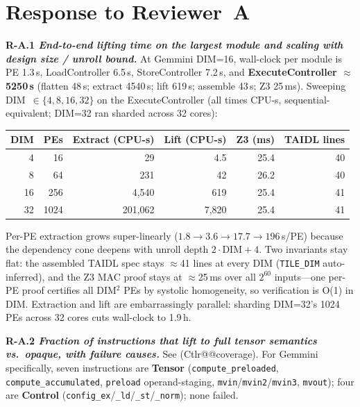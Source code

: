 \documentclass[sigconf, anonymous]{acmart}
\makeatletter
\newcommand{\cref}[1]{(C\csname tlr@@#1\endcsname)}
\makeatother
\begin{document}
\section*{Response to Reviewer~A}

\noindent\textbf{R-A.1 \emph{End-to-end lifting time on the largest module and scaling with design size / unroll bound.}}
At Gemmini DIM=16, wall-clock per module is PE 1.3\,s, LoadController
6.5\,s, StoreController 7.2\,s, and \textbf{ExecuteController
$\approx$5250\,s} (flatten 48\,s; extract 4540\,s; lift 619\,s; assemble
43\,s; Z3 25\,ms). Sweeping DIM~$\in\{4,8,16,32\}$ on the
ExecuteController (all times CPU-s, sequential-equivalent; DIM=32 ran
sharded across 32 cores):

\smallskip
\noindent\begin{minipage}{\linewidth}\centering\scriptsize
\begin{tabular}{@{}rrrrrr@{}}
\toprule
DIM & PEs & Extract (CPU-s) & Lift (CPU-s) & Z3 (ms) & TAIDL lines \\
\midrule
 4 &   16 &       29   &     4.5 & 25.4 & 40 \\
 8 &   64 &      231   &      42 & 26.2 & 40 \\
16 &  256 &   4{,}540  &     619 & 25.4 & 41 \\
32 & 1024 & 201{,}062  & 7{,}820 & 25.4 & 41 \\
\bottomrule
\end{tabular}
\end{minipage}
\smallskip

\noindent
Per-PE extraction grows super-linearly
($1.8\!\to\!3.6\!\to\!17.7\!\to\!196$\,s/PE) because the dependency cone
deepens with unroll depth $2\!\cdot\!\text{DIM}+4$. Two invariants stay
flat: the assembled TAIDL spec stays $\approx$41 lines at every DIM
(\texttt{TILE\_DIM} auto-inferred), and the Z3 MAC proof stays at
$\approx$25\,ms over all $2^{60}$ inputs---one per-PE proof certifies
all DIM$^2$ PEs by systolic homogeneity, so verification is O(1) in
DIM. Extraction and lift are embarrassingly parallel: sharding DIM=32's
1024 PEs across 32 cores cuts wall-clock to 1.9\,h.

\noindent\textbf{R-A.2 \emph{Fraction of instructions that lift to full tensor semantics vs.\ opaque, with failure causes.}}
See \cref{coverage}. For Gemmini specifically, seven instructions are
\textbf{Tensor} (\texttt{compute\_preloaded}, \texttt{compute\_accumulated},
\texttt{preload} operand-staging, \texttt{mvin}/\texttt{mvin2}/\texttt{mvin3},
\texttt{mvout}); four are \textbf{Control}
(\texttt{config\_ex}/\texttt{\_ld}/\texttt{\_st}/\texttt{\_norm}); none
failed.
\end{document}
